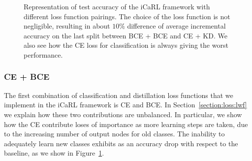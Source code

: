 \documentclass[10pt,twocolumn,letterpaper]{article}
\begin{document}
\begin{figure}
\caption{Representation of test accuracy of the iCaRL framework with different loss function pairings. The choice of the loss function is not negligible, resulting in about $10\%$ difference of average incremental accuracy on the last split between BCE + BCE and CE + KD. We also see how the CE loss for classification is always giving the worst performance.}
\label{fig:loss:plot}
\end{figure}

\subsubsection{CE + BCE}
\label{section:loss:cebce}
The first combination of classification and distillation loss functions that we implement in the iCaRL framework is CE and BCE. In Section~\ref{section:loss:lwf} we explain how these two contributions are unbalanced. In particular, we show how the CE contribute loses of importance as more learning steps are taken, due to the increasing number of output nodes for old classes. The inability to adequately learn new classes exhibits as an accuracy drop with respect to the baseline, as we show in Figure~\ref{fig:loss:plot}.
\end{document}
